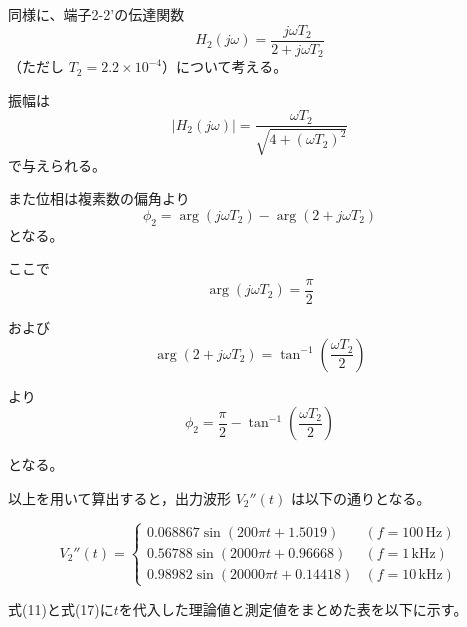 \documentclass[article]{jlreq}
\begin{document}
同様に、端子2-2'の伝達関数
\[
H_2(j\omega)=\frac{j\omega T_2}{2+j\omega T_2}
\]
（ただし $T_2=2.2\times10^{-4}$）について考える。

振幅は
\begin{equation}
|H_2(j\omega)|
=
\frac{\omega T_2}
{\sqrt{4+(\omega T_2)^2}}
\end{equation}
で与えられる。

また位相は複素数の偏角より
\begin{equation}
\phi_2
=
\arg(j\omega T_2)
-
\arg(2+j\omega T_2)
\end{equation}
となる。

ここで
\begin{equation}
\arg(j\omega T_2)=\frac{\pi}{2}
\end{equation}

および
\begin{equation}
\arg(2+j\omega T_2)
=
\tan^{-1}
\left(
\frac{\omega T_2}{2}
\right)
\end{equation}

より
\begin{equation}
\phi_2
=
\frac{\pi}{2}
-
\tan^{-1}
\left(
\frac{\omega T_2}{2}
\right)
\end{equation}

となる。

以上を用いて算出すると，出力波形
$V_2''(t)$ は以下の通りとなる。

\begin{equation}
V_2''(t) = \begin{cases} 
0.068867 \sin(200\pi t + 1.5019) & (f = 100\,\text{Hz}) \\
0.56788 \sin(2000\pi t + 0.96668) & (f = 1\,\text{kHz}) \\
0.98982 \sin(20000\pi t + 0.14418) & (f = 10\,\text{kHz})
\end{cases}
\end{equation}


式(11)と式(17)に$t$を代入した理論値と測定値をまとめた表を以下に示す。
\end{document}
